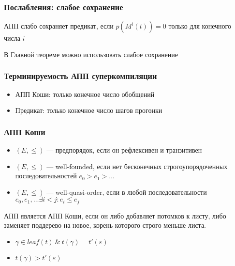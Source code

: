 \documentclass{beamer}
\begin{document}
\begin{frame}[fragile]
  \transwipe[direction=90]
  \frametitle{Послабления: слабое сохранение}

  АПП слабо сохраняет предикат, если $p(M^i(t)) = 0$ только для конечного числа $i$

\vfill

  В Главной теореме можно использовать слабое сохранение
\end{frame} 


\begin{frame}[fragile]
  \transwipe[direction=90]
  \frametitle{Терминируемость АПП суперкомпиляции}

\begin{itemize}
  \item АПП Коши: только конечное число обобщений
  \item Предикат: только конечное число шагов прогонки
\end{itemize}
\end{frame} 


\begin{frame}[fragile]
  \transwipe[direction=90]
  \frametitle{ АПП Коши  }

  \begin{itemize}
    \item $(E, \leq)$ --- предпорядок, если он рефлексивен и транзитивен
    \item $(E, \leq)$ --- well-founded, если нет бесконечных строгоупорядоченных последовательностей $e_0 > e_1 > \dots$
    \item $(E, \leq)$ --- well-quasi-order, если в любой последовательности $e_0, e_1, \dots \exists i < j: e_i \leq e_j$ 

  \end{itemize} 

  \vfill 

  АПП является АПП Коши, если он либо добавляет потомков к листу, либо заменяет поддерево на новое, корень которого строго меньше листа. 

  \begin{itemize}
    \item $\gamma \in leaf(t) \ \& \ t(\gamma) = t'(\varepsilon)$
    \item $t(\gamma) > t'(\varepsilon)$
  \end{itemize}
\end{frame} 
\end{document}
